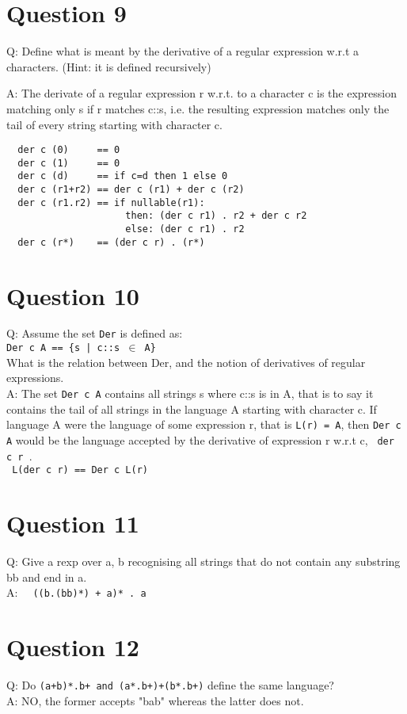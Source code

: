 \documentclass[english]{scrartcl}
\begin{document}
\section*{Question 9}
Q: Define what is meant by the derivative of a regular expression w.r.t a characters. (Hint: it is defined recursively)

A: The derivate of a regular expression r w.r.t. to a character c is the expression matching only s if r matches c::s, i.e. the resulting expression
matches only the tail of every string starting with character c.

\begin{verbatim}
  der c (0)     == 0
  der c (1)     == 0
  der c (d)     == if c=d then 1 else 0
  der c (r1+r2) == der c (r1) + der c (r2)
  der c (r1.r2) == if nullable(r1):
                     then: (der c r1) . r2 + der c r2
                     else: (der c r1) . r2
  der c (r*)    == (der c r) . (r*)
\end{verbatim}

\section*{Question 10}
Q: Assume the set \verb|Der| is defined as: \\
\verb~Der c A == {s | c::s ~$\in$\verb~ A}~ \\
What is the relation between Der, and the notion of derivatives of regular expressions. \\
A: The set \verb~Der c A~ contains all strings s where c::s is in A, that is to say it contains the tail of all strings in the language A starting with character c.
If language A were the language of some expression r, that is \verb~L(r) = A~, then \verb~Der c A~ would be the language accepted by the derivative
of expression r w.r.t c, \verb~ der c r ~. \\
\verb~ L(der c r) == Der c L(r) ~

\section*{Question 11}
Q: Give a rexp over {a, b} recognising all strings that do not contain any substring bb and end in a. \\
A: \verb~  ((b.(bb)*) + a)* . a ~

\section*{Question 12}
Q: Do \verb|(a+b)*.b+ and (a*.b+)+(b*.b+)| define the same language? \\
A: NO, the former accepts "bab" whereas the latter does not.
\end{document}
